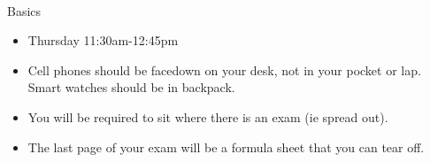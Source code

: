 \documentclass[11pt,fleqn]{article}
\begin{document}
\renewcommand{\headrulewidth}{0pt}
\newcommand{\blank}[1]{\rule{#1}{0.75pt}}
\newcommand{\bc}{\begin{center}}
\newcommand{\ec}{\end{center}}
\renewcommand{\d}{\displaystyle}

\vspace*{-0.7in}

\begin{center}
  \large
  \\
   
\end{center}
{\Large{Basics}}\\

\begin{itemize}
\item Thursday 11:30am-12:45pm
\item Cell phones should be facedown on your desk, not in your pocket or lap. Smart watches should be in backpack.
\item You will be required to sit where there is an exam (ie spread out).
\item The last page of your exam will be a formula sheet that you can tear off.
\end{itemize}

\vspace{.2in}

\\
\end{document}
